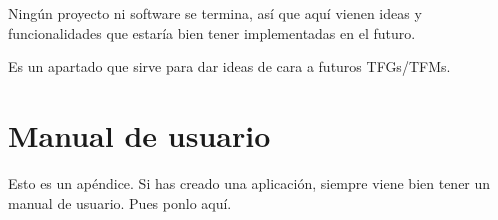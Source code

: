 \documentclass[a4paper, 12pt]{book}
\begin{document}
Ningún proyecto ni software se termina, así que aquí vienen ideas y funcionalidades que estaría bien tener implementadas en el futuro.

Es un apartado que sirve para dar ideas de cara a futuros TFGs/TFMs.



\cleardoublepage
\appendix
\chapter{Manual de usuario}
\label{app:manual}

Esto es un apéndice.
Si has creado una aplicación, siempre viene bien tener un manual de usuario.
Pues ponlo aquí.


\cleardoublepage


\end{document}
